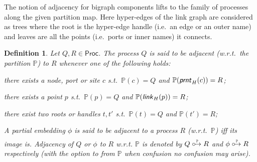 \documentclass[a4paper,english,10pt]{article}
\theoremstyle{plain}\newtheorem{theorem}{Theorem}
\theoremstyle{plain}\newtheorem{corollary}[theorem]{Corollary}
\theoremstyle{plain}\newtheorem{proposition}[theorem]{Proposition}
\theoremstyle{plain}\newtheorem{lemma}[theorem]{Lemma}
\theoremstyle{plain}\newtheorem{definition}{Definition}
\theoremstyle{plain}\newtheorem{remark}{Remark}
\theoremstyle{plain}\newtheorem{example}[remark]{Example}
\newcommand{\?}[1]{}
\newcommand{\prnt}{\textsf{\textit{prnt}}}
\newcommand{\link}{\textsf{\textit{link}}}
\newcommand{\mbb}[1]{\mathbb{#1}}
\newcommand{\msf}[1]{\mathsf{#1}}
\newcommand{\prt}{\mbb}
\newcommand{\adjto}{\mathrel{{\circ}\!{\to}}}
\begin{document}
The notion of adjacency for bigraph components lifts
to the family of processes along the given partition map. Here
hyper-edges of the link graph are considered as trees
where the root is the hyper-edge handle (i.e.~an edge or an outer name)
and leaves are all the points (i.e.~ports or inner names) it connects.
\begin{definition}\label{def:proc-adjto}
Let $Q,R \in \msf{Proc}$. The process $Q$ is said to be \emph{adjacent (w.r.t.~the partition $\prt P$) to} $R$ whenever one of the following holds:
\begin{description}\itemsep=0pt
	\item[(ADJ-P)\label{def:adj-p}] there exists a node, port or site $c$ s.t.~$\prt P(c) = Q$ and $\prt P(\prnt_H(c)) = R$;
	\item[(ADJ-L)\label{def:adj-l}] there exists a point $p$ s.t.~$\prt P(p) = Q$ and $\prt P(\link_H(p)) = R$;
	\item[(ADJ-T)\label{def:adj-t}] there exist two roots or handles $t,t'$ s.t.~$\prt P(t) = Q$ and $\prt P(t') = R$;
\end{description}
A partial embedding $\phi$ is said to be adjacent to a process $R$
(w.r.t.~$\prt P$) iff its image is. \vspace{-1.3ex}
Adjacency of $Q$ or $\phi$ to $R$ w.r.t. $\prt P$ is denoted by
${Q \stackrel{\raisebox{-2ex}{$\scriptscriptstyle\, \prt P$}}{\adjto} R}$
and ${\phi \stackrel{\raisebox{-2ex}{$\scriptscriptstyle\, \prt P$}}{\adjto} R}$
respectively (with the option to from $\prt P$ when confusion no confusion may arise). 
\end{definition}
\end{document}
